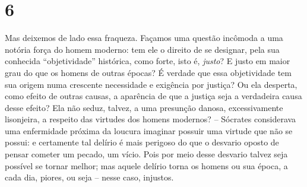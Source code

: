 \chapter{6}\label{capuxedtulo-6}

Mas deixemos de lado essa fraqueza. Façamos uma questão incômoda a uma
notória força do homem moderno: tem ele o direito de se designar, pela
sua conhecida ``objetividade'' histórica, como forte, isto é,
\emph{justo}? E justo em maior grau do que os homens de outras épocas? É
verdade que essa objetividade tem sua origem numa crescente necessidade
e exigência por justiça? Ou ela desperta, como efeito de outras causas,
a aparência de que a justiça seja a verdadeira causa desse efeito? Ela
não seduz, talvez, a uma presunção danosa, excessivamente lisonjeira, a
respeito das virtudes dos homens modernos? -- Sócrates considerava uma
enfermidade próxima da loucura imaginar possuir uma virtude que não se
possui: e certamente tal delírio é mais perigoso do que o desvario
oposto de pensar cometer um pecado, um vício. Pois por meio desse
desvario talvez seja possível se tornar melhor; mas aquele delírio torna
os homens ou sua época, a cada dia, piores, ou seja -- nesse caso, injustos.

